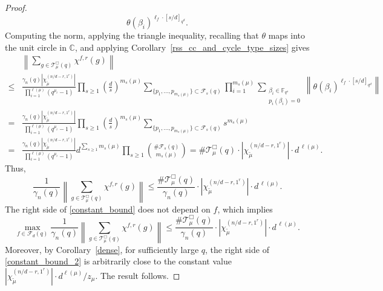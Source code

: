 \documentclass[10pt]{article}
\theoremstyle{definition}
\newcommand{\Cbb}{\mathbb{C}}
\newcommand{\F}{\mathbb{F}}
\newcommand{\CF}{\mathcal{F}}
\newcommand{\CT}{\mathcal{T}}
\newcommand{\te}{\theta}
\begin{document}
\begin{proof}
\begin{equation}
\te(\beta_i)^{\ell_f \cdot [s/d]_{q^d}}.
\end{equation}
Computing the norm, applying the triangle inequality, recalling that \(\te\) maps into the unit circle in \(\Cbb\), and applying Corollary~\ref{rss_cc_and_cycle_type_sizes} gives
\begin{align*}
& \left \|
\sum_{g \in \CT^\Box_\mu (q)} \chi^{f,r} (g)
\right \| \\
\leq &
\frac{\gamma_n(q) \left | \chi^{(n/d-r,1^r)}_{\tilde{\mu}} \right |}{\prod_{i=1}^{\ell(\mu)} (q^{\mu_i}-1)}
\prod_{s \geq 1}
\left (
\frac{d}{s}
\right )^{m_s(\mu)}
\sum_{ \{p_1,\ldots,p_{m_s(\mu)}\} \subset \CF_s (q) }
\prod_{i=1}^{m_s(\mu)}
\sum_{\substack{\beta_i \in \F_{q^s} \\ p_i(\beta_i)=0}}
\left \|
\te(\beta_i)^{\ell_f \cdot [s/d]_{q^d}}
\right \| \\
= &
\frac{\gamma_n(q) \left | \chi^{(n/d-r,1^r)}_{\tilde{\mu}} \right |}{\prod_{i=1}^{\ell(\mu)} (q^{\mu_i}-1)}
\prod_{s \geq 1}
\left (
\frac{d}{s}
\right )^{m_s(\mu)}
\sum_{ \{p_1,\ldots,p_{m_s(\mu)}\} \subset \CF_s (q) }
s^{m_s(\mu)} \\
= &
\frac{\gamma_n(q) \left |\chi^{(n/d-r,1^r)}_{\tilde{\mu}} \right |}{\prod_{i=1}^{\ell(\mu)} (q^{\mu_i}-1)}
d^{\sum_{s \geq 1} m_s(\mu)}
\prod_{s \geq 1}
\binom{\# \CF_s (q)}{m_s(\mu)} = \# \CT_\mu^\Box (q) \cdot \left | \chi^{(n/d-r,1^r)}_{\tilde{\mu}} \right | \cdot d^{\, \ell(\mu)}.
\end{align*}
Thus,
\begin{equation}
\label{constant_bound}
\frac{1}{\gamma_n(q)}
\left \|
\sum_{g \in \CT_\mu^\Box (q)} \chi^{f,r} (g)
\right \|
\leq
\frac{\# \CT_\mu^\Box (q)}{
\gamma_n (q)}
\cdot \left | \chi^{(n/d-r,1^r)}_{\tilde{\mu}} \right | \cdot d^{\, \ell(\mu)}.
\end{equation}
The right side of \eqref{constant_bound} does not depend on \(f\), which implies
\begin{equation}
\label{constant_bound_2}
\max_{f \in \CF_d (q)}
\frac{1}{\gamma_n(q)}
\left \|
\sum_{g \in \CT_\mu^\Box (q)} \chi^{f,r} (g)
\right \|
\leq
\frac{\# \CT_\mu^\Box (q)}{
\gamma_n (q)}
\cdot \left | \chi^{(n/d-r,1^r)}_{\tilde{\mu}} \right | \cdot d^{\, \ell(\mu)}.
\end{equation}
Moreover, by Corollary~\ref{dense}, for sufficiently large \(q\), the right side of \eqref{constant_bound_2} is arbitrarily close to the constant value \(|\chi_{\tilde{\mu}}^{(n/d-r,1^r)}| \cdot d^{\ell(\mu)} / z_\mu\).
The result follows.
\end{proof}
\end{document}
